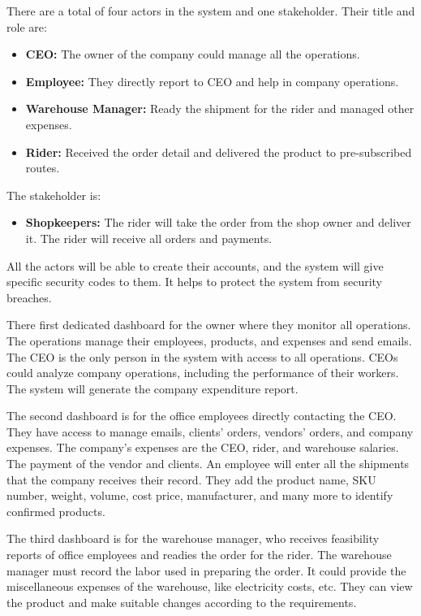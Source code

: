 \documentclass[12pt,a4paper]{report}
\begin{document}
There are a total of four actors in the system and one stakeholder. Their title and role are:
\begin{itemize}
\item \textbf{ CEO:} The owner of the company could manage all the operations.
\item \textbf{Employee:} They directly report to CEO and help in company operations.  
\item \textbf{Warehouse Manager:} Ready the shipment for the rider and managed other expenses.
\item \textbf{Rider:} Received the order detail and delivered the product to pre-subscribed routes.
\end{itemize}
The stakeholder is:
\begin{itemize}
\item \textbf{Shopkeepers:} The rider will take the order from the shop owner and deliver it. The rider will receive all orders and payments.
\end{itemize}
All the actors will be able to create their accounts, and the system will give specific security codes to them. It helps to protect the system from security breaches.
 
There first dedicated dashboard for the owner where they monitor all operations. The operations manage their employees, products, and expenses and send emails. The CEO is the only person in the system with access to all operations. CEOs could analyze company operations, including the performance of their workers. The system will generate the company expenditure report.
 
The second dashboard is for the office employees directly contacting the CEO. They have access to manage emails, clients' orders, vendors' orders, and company expenses. The company's expenses are the CEO, rider, and warehouse salaries. The payment of the vendor and clients. An employee will enter all the shipments that the company receives their record. They add the product name, SKU number, weight, volume, cost price, manufacturer, and many more to identify confirmed products.
 
The third dashboard is for the warehouse manager, who receives feasibility reports of office employees and readies the order for the rider. The warehouse manager must record the labor used in preparing the order. It could provide the miscellaneous expenses of the warehouse, like electricity costs, etc. They can view the product and make suitable changes according to the requirements. 
 
\end{document}
